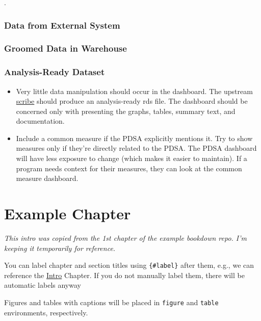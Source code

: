 \documentclass[
]{book}
\begin{document}
.

\hypertarget{data-from-external-system}{%
\subsection{Data from External System}\label{data-from-external-system}}

\hypertarget{groomed-data-in-warehouse}{%
\subsection{Groomed Data in Warehouse}\label{groomed-data-in-warehouse}}

\hypertarget{analysis-ready-dataset}{%
\subsection{Analysis-Ready Dataset}\label{analysis-ready-dataset}}

\begin{itemize}
\item
  Very little data manipulation should occur in the dashboard. The upstream \protect\hyperlink{pattern-scribe}{scribe} should produce an analysis-ready rds file. The dashboard should be concerned only with presenting the graphs, tables, summary text, and documentation.
\item
  Include a common measure if the PDSA explicitly mentions it. Try to show measures only if they're directly related to the PDSA. The PDSA dashboard will have less exposure to change (which makes it easier to maintain). If a program needs context for their measures, they can look at the common measure dashboard.
\end{itemize}

\hypertarget{example-chapter}{%
\chapter{Example Chapter}\label{example-chapter}}

\emph{This intro was copied from the 1st chapter of the example bookdown repo. I'm keeping it temporarily for reference.}

You can label chapter and section titles using \texttt{\{\#label\}} after them, e.g., we can reference the \protect\hyperlink{intro}{Intro} Chapter. If you do not manually label them, there will be automatic labels anyway

Figures and tables with captions will be placed in \texttt{figure} and \texttt{table} environments, respectively.
\end{document}

